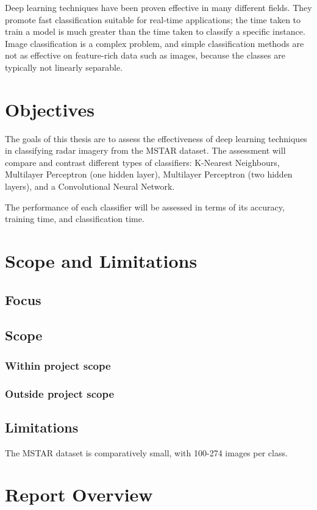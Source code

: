 Deep learning techniques have been proven effective in many different fields. They promote fast classification suitable for real-time applications; the time taken to train a model is much greater than the time taken to classify a specific instance. Image classification is a complex problem, and simple classification methods are not as effective on feature-rich data such as images, because the classes are typically not linearly separable.


\section{Objectives}

The goals of this thesis are to assess the effectiveness of deep learning techniques in classifying radar imagery from the MSTAR dataset. The assessment will compare and contrast different types of classifiers: K-Nearest Neighbours, Multilayer Perceptron (one hidden layer), Multilayer Perceptron (two hidden layers), and a Convolutional Neural Network.

The performance of each classifier will be assessed in terms of its accuracy, training time, and classification time.

\section{Scope and Limitations}

\subsection{Focus}
\subsection{Scope}
\subsubsection{Within project scope}
\subsubsection{Outside project scope}
\subsection{Limitations}
The MSTAR dataset is comparatively small, with 100-274 images per class.




\section{Report Overview}


